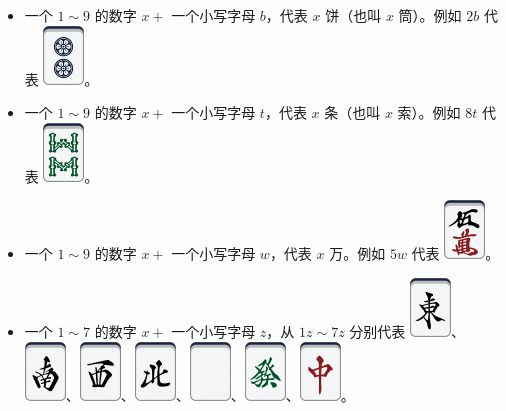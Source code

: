 \documentclass{../cpct/ctpro}
\begin{document}
\begin{itemize}
    \item 一个 $1 \sim 9$ 的数字 $x+$ 一个小写字母 $b$，代表 $x$ 饼（也叫 $x$ 筒）。例如 $2b$ 代表 \includegraphics[scale=0.5]{images/mahjong/2p.png}。
    \item 一个 $1 \sim 9$ 的数字 $x+$ 一个小写字母 $t$，代表 $x$ 条（也叫 $x$ 索）。例如 $8t$ 代表 \includegraphics[scale=0.5]{images/mahjong/8s.png}。
    \item 一个 $1 \sim 9$ 的数字 $x+$ 一个小写字母 $w$，代表 $x$ 万。例如 $5w$ 代表 \includegraphics[scale=0.5]{images/mahjong/5m.png}。
    \item 一个 $1 \sim 7$ 的数字 $x+$ 一个小写字母 $z$，从 $1z \sim 7z$ 分别代表 \includegraphics[scale=0.5]{images/mahjong/1z.png}、\includegraphics[scale=0.5]{images/mahjong/2z.png}、\includegraphics[scale=0.5]{images/mahjong/3z.png}、\includegraphics[scale=0.5]{images/mahjong/4z.png}、\includegraphics[scale=0.5]{images/mahjong/5z.png}、\includegraphics[scale=0.5]{images/mahjong/6z.png}、\includegraphics[scale=0.5]{images/mahjong/7z.png}。
\end{itemize}
\end{document}
